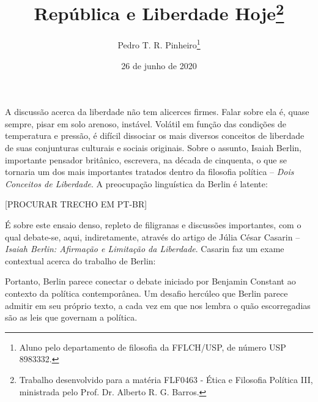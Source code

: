 \documentclass[12pt,a4paper]{article}
\author{Pedro T. R. Pinheiro\footnote{Aluno pelo departamento de filosofia 
da FFLCH/USP, de número USP 8983332. }}
\title{República e Liberdade Hoje\footnote{
	Trabalho desenvolvido para a matéria FLF0463 - Ética e Filosofia 
	Política III, ministrada pelo Prof. Dr. Alberto R. G. Barros. }}
\date{26 de junho de 2020}
\begin{document}
	\maketitle
	
	\onehalfspacing
	\setlength{\parskip}{0.5cm}

	A discussão acerca da liberdade não tem alicerces firmes. Falar sobre ela é, quase 
	sempre, pisar em solo arenoso, instável. Volátil em função das condições de 
	temperatura e pressão, é difícil dissociar os mais diversos conceitos de liberdade 
	de suas conjunturas culturais e sociais originais. Sobre o assunto, Isaiah Berlin, 
	importante pensador britânico, escrevera, na década de cinquenta, o que se tornaria 
	um dos mais importantes tratados dentro da filosofia política -- \textit{Dois 
	Conceitos de Liberdade}. A preocupação linguística da Berlin é latente: 

	 [PROCURAR TRECHO EM PT-BR]

	É sobre este ensaio denso, repleto de filigranas e discussões 
	importantes, com o qual debate-se, aqui, indiretamente, através do artigo de 
	Júlia César Casarin -- \textit{Isaiah Berlin: Afirmação e Limitação da Liberdade}. 
	Casarin faz um exame contextual acerca do trabalho de Berlin: 


	Portanto, Berlin parece conectar o debate iniciado por Benjamin Constant ao contexto 
	da política contemporânea. Um desafio hercúleo que Berlin parece admitir em seu 
	próprio texto, a cada vez em que nos lembra o quão escorregadias são as leis que 
	governam a política. 

	

	
	
	
\end{document}
